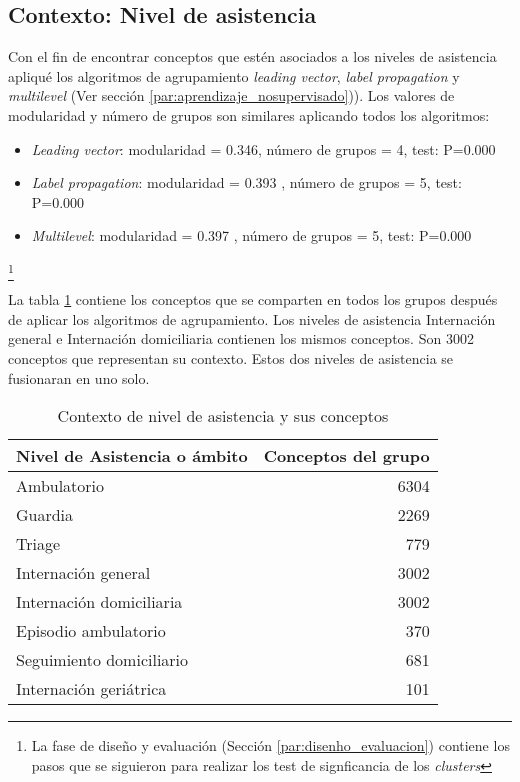 \subsection{Contexto: Nivel de asistencia}
Con el fin de encontrar conceptos que estén asociados a los niveles de asistencia apliqué los algoritmos de agrupamiento \textit{leading vector}, \textit{label propagation} y \textit{multilevel} (Ver sección \ref{par:aprendizaje_nosupervisado})). Los valores de modularidad y número de grupos son similares aplicando todos los algoritmos:
\begin{itemize}
\item \textit{Leading vector}: modularidad = \num{0.346}, número de grupos = 4, test: P=0.000
\item \textit{Label propagation}: modularidad = \num{0.393} , número de grupos = 5, test: P=0.000
\item \textit{Multilevel}: modularidad = \num{0.397} , número de grupos = 5, test: P=0.000
\end{itemize}
\footnote{La fase de diseño y evaluación (Sección \ref{par:disenho_evaluacion}) contiene los pasos que se siguieron para realizar los test de signficancia de los \textit{clusters}}

La tabla \ref{nivel_asistencia_clus} contiene los conceptos que se comparten en todos los grupos después de aplicar los algoritmos de agrupamiento. Los niveles de asistencia Internación general e Internación domiciliaria contienen los mismos conceptos. Son 3002 conceptos que representan su contexto. Estos dos niveles de asistencia se fusionaran en uno solo.

\begin{table}[htb]
\centering
\caption{Contexto de nivel de asistencia y sus conceptos }
\label{nivel_asistencia_clus}
\begin{tabular}{@{}lr@{}}
\toprule
Nivel de Asistencia o ámbito & Conceptos del grupo \\ \midrule
Ambulatorio & \num{6304} \\
Guardia & \num{2269} \\
Triage & \num{779} \\
Internación general & \num{3002} \\
Internación domiciliaria  & \num{3002}\\
Episodio ambulatorio & \num{370} \\
Seguimiento domiciliario & \num{681}\\
Internación geriátrica & \num{101} \\ \bottomrule
\end{tabular}
\end{table}


